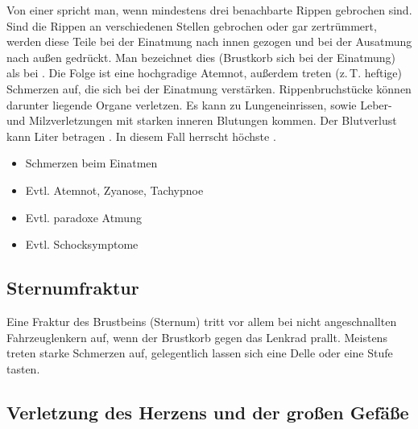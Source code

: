 {%
Von einer  spricht man,
wenn mindestens drei benachbarte Rippen gebrochen sind. Sind
die Rippen an verschiedenen Stellen gebrochen oder gar
zertrümmert, werden diese Teile bei der Einatmung nach innen
gezogen und bei der Ausatmung nach außen gedrückt. Man
bezeichnet dies (Brustkorb  sich bei der Einatmung)
als  bei . Die Folge ist eine
hochgradige Atemnot, außerdem treten (z.\,T. heftige)
Schmerzen auf, die sich bei der Einatmung verstärken. Rippenbruchstücke können
darunter liegende Organe verletzen. Es kann
zu Lungeneinrissen, sowie Leber- und Milzverletzungen mit
starken inneren Blutungen kommen. Der Blutverlust kann  Liter
betragen \cite{LPN3}. In diesem Fall herrscht höchste
.
}{
\begin{itemize}
  \item Schmerzen beim Einatmen
  \item Evtl. Atemnot, Zyanose, Tachypnoe
  \item Evtl. paradoxe Atmung
  \item Evtl. Schocksymptome
\end{itemize}
}{}{}{}

\subsection{Sternumfraktur}\label{topic:sternumfraktur}
Eine Fraktur des Brustbeins (Sternum) tritt vor allem bei
nicht angeschnallten Fahrzeuglenkern auf, wenn der Brustkorb
gegen das Lenkrad prallt. Meistens treten starke Schmerzen
auf, gelegentlich lassen sich eine Delle oder eine Stufe
tasten. \cite{LPN3}

\subsection{Verletzung des Herzens und der großen Gefäße}

